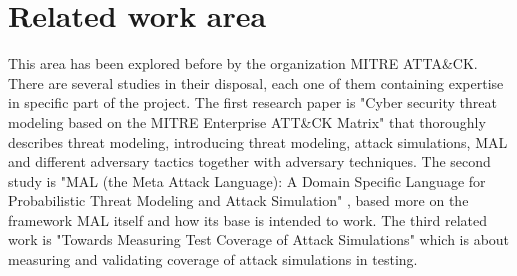 \documentclass[english]{kththesis}
\begin{document}
\section{Related work area}

\noindent This area has been explored before by the organization MITRE ATTA\&CK. There are several studies in their disposal, each one of them containing expertise in specific part of the project. The first research paper is "Cyber security threat modeling based on the MITRE Enterprise ATT\&CK Matrix" \cite{xiong2021cyber} that thoroughly describes threat modeling, introducing threat modeling, attack simulations, \gls{MAL} and different adversary tactics together with adversary techniques. The second study is "MAL (the Meta Attack Language): A Domain Specific Language for Probabilistic Threat Modeling and Attack Simulation" \cite{johnson2018mal}, based more on the framework \gls{MAL} itself and how its base is intended to work. The third related work is "Towards Measuring Test Coverage of Attack Simulations" \cite{hersen2021towards} which is about measuring and validating coverage of attack simulations in testing.
\end{document}
